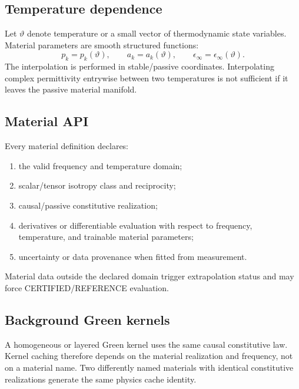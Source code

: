 \subsection{Temperature dependence}

Let $\vartheta$ denote temperature or a small vector of thermodynamic state
variables. Material parameters are smooth structured functions:
\[
  p_k=p_k(\vartheta),\qquad
  a_k=a_k(\vartheta),\qquad
  \epsilon_\infty=\epsilon_\infty(\vartheta).
\]
The interpolation is performed in stable/passive coordinates. Interpolating
complex permittivity entrywise between two temperatures is not sufficient if it
leaves the passive material manifold.

\subsection{Material API}

Every material definition declares:
\begin{enumerate}
\item the valid frequency and temperature domain;
\item scalar/tensor isotropy class and reciprocity;
\item causal/passive constitutive realization;
\item derivatives or differentiable evaluation with respect to frequency,
      temperature, and trainable material parameters;
\item uncertainty or data provenance when fitted from measurement.
\end{enumerate}

Material data outside the declared domain trigger extrapolation status and may
force CERTIFIED/REFERENCE evaluation.

\subsection{Background Green kernels}

A homogeneous or layered Green kernel uses the same causal constitutive law.
Kernel caching therefore depends on the material realization and frequency, not
on a material name. Two differently named materials with identical
constitutive realizations generate the same physics cache identity.
